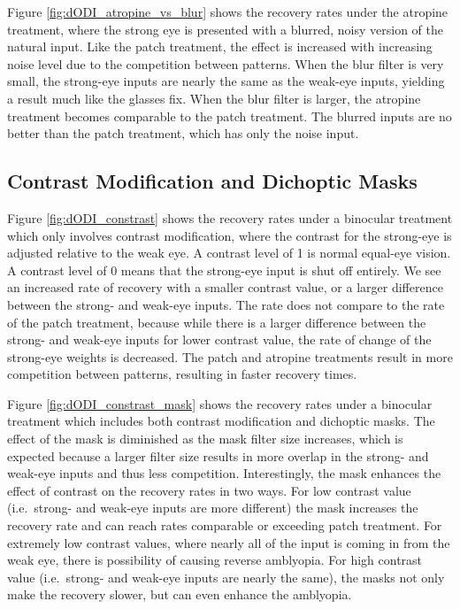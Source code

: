 \documentclass[
  onecolumn]{article}
\begin{document}
Figure \ref{fig:dODI_atropine_vs_blur} shows the recovery rates under
the atropine treatment, where the strong eye is presented with a
blurred, noisy version of the natural input. Like the patch treatment,
the effect is increased with increasing noise level due to the
competition between patterns. When the blur filter is very small, the
strong-eye inputs are nearly the same as the weak-eye inputs, yielding a
result much like the glasses fix. When the blur filter is larger, the
atropine treatment becomes comparable to the patch treatment. The
blurred inputs are no better than the patch treatment, which has only
the noise input.

\hypertarget{contrast-modification-and-dichoptic-masks}{%
\subsection{Contrast Modification and Dichoptic
Masks}\label{contrast-modification-and-dichoptic-masks}}

Figure \ref{fig:dODI_constrast} shows the recovery rates under a
binocular treatment which only involves contrast modification, where the
contrast for the strong-eye is adjusted relative to the weak eye. A
contrast level of 1 is normal equal-eye vision. A contrast level of 0
means that the strong-eye input is shut off entirely. We see an
increased rate of recovery with a smaller contrast value, or a larger
difference between the strong- and weak-eye inputs. The rate does not
compare to the rate of the patch treatment, because while there is a
larger difference between the strong- and weak-eye inputs for lower
contrast value, the rate of change of the strong-eye weights is
decreased. The patch and atropine treatments result in more competition
between patterns, resulting in faster recovery times.

Figure \ref{fig:dODI_constrast_mask} shows the recovery rates under a
binocular treatment which includes both contrast modification and
dichoptic masks. The effect of the mask is diminished as the mask filter
size increases, which is expected because a larger filter size results
in more overlap in the strong- and weak-eye inputs and thus less
competition. Interestingly, the mask enhances the effect of contrast on
the recovery rates in two ways. For low contrast value (i.e.~strong- and
weak-eye inputs are more different) the mask increases the recovery rate
and can reach rates comparable or exceeding patch treatment. For
extremely low contrast values, where nearly all of the input is coming
in from the weak eye, there is possibility of causing reverse amblyopia.
For high contrast value (i.e.~strong- and weak-eye inputs are nearly the
same), the masks not only make the recovery slower, but can even enhance
the amblyopia.
\end{document}
